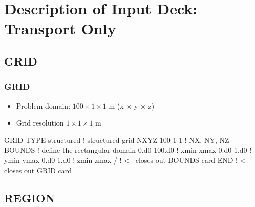 \documentclass{beamer}
\newcommand\bluecomment[1]{{{\color{blue} #1}}}
\begin{document}
\section{Description of Input Deck: Transport Only}


\subsection{GRID}
\begin{frame}\frametitle{GRID}

\begin{itemize}
  \item Problem domain: $100 \times 1 \times 1$ m (x $\times$ y $\times$ z)
  \item Grid resolution $1 \times 1 \times 1$ m
\end{itemize}

\begin{semiverbatim}
GRID
  TYPE structured        \bluecomment{! structured grid}
  NXYZ 100 1 1           \bluecomment{! NX, NY, NZ}
  BOUNDS          \bluecomment{! define the rectangular domain}
    0.d0 100.d0   \bluecomment{! xmin xmax}
    0.d0 1.d0     \bluecomment{! ymin ymax}
    0.d0 1.d0     \bluecomment{! zmin zmax}
  /  \bluecomment{! <-- closes out BOUNDS card}
END  \bluecomment{! <-- closes out GRID card}
\end{semiverbatim}

\end{frame}

\subsection{REGION}
\end{document}
